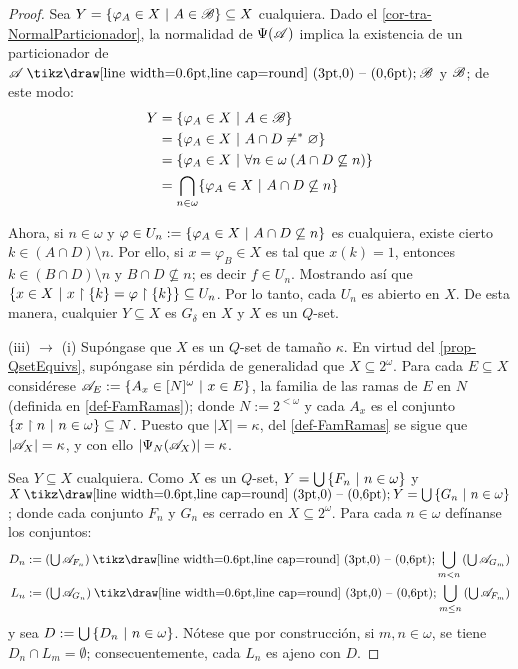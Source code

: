 \begin{proof}
	Sea $Y = \{ \varphi_A \in X \text{ $|$ } A \in \mathscr{B} \} \subseteq X$ cualquiera. Dado el \autoref{cor-tra-NormalParticionador}, la normalidad de $\Psi(\mathscr{A})$ implica la existencia de un particionador de $\ms{A}\setminus \ms{B}$ y $\mathscr{B}$; de este modo:
	\begin{align*}
		Y & = \{ \varphi_A \in X \text{ $|$ } A \in \mathscr{B} \}                                        \\
		  & = \{ \varphi_A \in X \text{ $|$ } A \cap D \neq^* \varnothing \}                           \\
		  & = \{ \varphi_A \in X \text{ $|$ } \forall n \in \omega \: ( A \cap D \not\subseteq n) \} \\
		  & = \bigcap_{n \in \omega} \{\varphi_A \in X \text{ $|$ } A \cap D \not\subseteq n\}
	\end{align*}

	Ahora, si $n \in \omega$ y $\varphi \in U_n:=\{\varphi_A \in X \text{ $|$ } A \cap D \not\subseteq n\}$ es cualquiera, existe cierto $k \in (A \cap D) \setminus n$. Por ello, si $x=\varphi_B \in X$ es tal que $x(k)=1$, entonces $k \in (B \cap D) \setminus n$ y $B \cap D \not \subseteq n$; es decir $f \in U_n$. Mostrando así que $\{ x \in X \text{ $|$ } x\upharpoonright \{k\} = \varphi \upharpoonright \{k\} \} \subseteq U_n$. Por lo tanto, cada $U_n$ es abierto en $X$. De esta manera, cualquier $Y \subseteq X$ es $G_\delta$ en $X$ y $X$ es un $Q$-set.

	(iii) $\to$ (i) Supóngase que $X$ es un $Q$-set de tamaño $\kappa$. En virtud del \autoref{prop-QsetEquivs}, supóngase sin pérdida de generalidad que $X \subseteq 2^\omega$. Para cada $E \subseteq X$ considérese $ \mathscr{A}_E:=\{ A_x \in [N]^\omega \text{ $|$ } x \in E \} $, la familia de las ramas de $E$ en $N$ (definida en \ref{def-FamRamas}); donde $N:=2^{<\omega}$ y cada $A_x$ es el conjunto $\{x \upharpoonright n \text{ $|$ } n \in \omega\} \subseteq N$. Puesto que $|X|=\kappa$, del \autoref{def-FamRamas} se sigue que $|\mathscr{A}_X|=\kappa$, y con ello $|\Psi_N(\mathscr{A}_X)|=\kappa$.

	Sea $Y \subseteq X$ cualquiera. Como $X$ es un $Q$-set, $Y=\mbox{$\bigcup$}\,\{F_n \text{ $|$ } n \in \omega\}$ y $X \setminus Y=\midcup\{G_n \tq n\in \omega\}$; donde cada conjunto $F_n$ y $G_n$ es cerrado en $X\subseteq 2^\omega$. Para cada $n \in \omega$ defínanse los conjuntos:
	\begin{align*}
		D_n := \left( \midcup \ms{A}_{F_n} \right) \setminus \bigcup_{m<n} \left( \midcup \ms{A}_{G_m} \right) \\
		L_n := \left( \midcup \ms{A}_{G_n} \right) \setminus \bigcup_{m\leq n} \left( \midcup \ms{A}_{F_m} \right)
	\end{align*}
	y sea $D:=\mbox{$\bigcup$}\,\{D_n \text{ $|$ } n \in \omega\}$. Nótese que por construcción, si $m,n \in \omega$, se tiene $D_n \cap L_m = \emptyset$; consecuentemente, cada $L_n$ es ajeno con $D$.


\end{proof}

